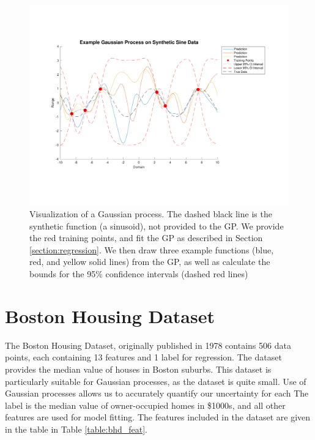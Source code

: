 \documentclass{article}
\begin{document}
\begin{figure}[H]
  \centering
  \label{fig:synthetic_data}
  \includegraphics[trim={0cm, 4cm, 0cm, 3cm},clip,scale=0.5]{synthetic_data}
  \caption{Visualization of a Gaussian process. The dashed black line is the synthetic function (a sinusoid), not
  provided to the GP. We provide the red training points, and fit the GP as described in Section
\ref{section:regression}. We then draw three example functions (blue, red, and yellow solid lines) from the GP, as well
as calculate the bounds for the 95\% confidence intervals (dashed red lines)}
\end{figure}

\section{Boston Housing Dataset}

The Boston Housing Dataset, originally published in 1978 contains 506 data points, each containing 13 features and 1
label for regression\cite{harrison_hedonic_1978}. The dataset provides the median value of houses in Boston suburbs.
This dataset is particularly suitable for Gaussian processes, as the dataset is quite small. Use of Gaussian processes
allows us to accurately quantify our uncertainty for each The label is the median value of owner-occupied homes in \$1000s, and
all other features are used for model fitting. The features included in the dataset are given in the table in Table
\ref{table:bhd_feat}.
\end{document}
